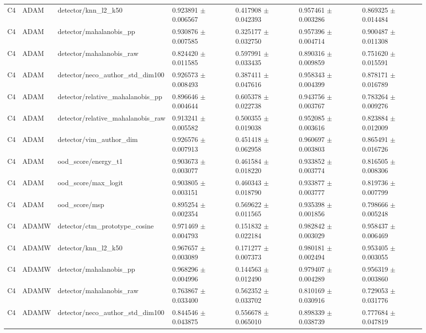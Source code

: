\begin{longtable}{lllllll}
C4 & ADAM & detector/knn\_l2\_k50 & 0.923891 $\pm$ 0.006567 & 0.417908 $\pm$ 0.042393 & 0.957461 $\pm$ 0.003286 & 0.869325 $\pm$ 0.014484 \\
C4 & ADAM & detector/mahalanobis\_pp & 0.930876 $\pm$ 0.007585 & 0.325177 $\pm$ 0.032750 & 0.957396 $\pm$ 0.004714 & 0.900487 $\pm$ 0.011308 \\
C4 & ADAM & detector/mahalanobis\_raw & 0.824420 $\pm$ 0.011585 & 0.597991 $\pm$ 0.033435 & 0.890316 $\pm$ 0.009859 & 0.751620 $\pm$ 0.015591 \\
C4 & ADAM & detector/neco\_author\_std\_dim100 & 0.926573 $\pm$ 0.008493 & 0.387411 $\pm$ 0.047616 & 0.958343 $\pm$ 0.004399 & 0.878171 $\pm$ 0.016789 \\
C4 & ADAM & detector/relative\_mahalanobis\_pp & 0.896646 $\pm$ 0.004644 & 0.605378 $\pm$ 0.022738 & 0.943756 $\pm$ 0.003767 & 0.783264 $\pm$ 0.009276 \\
C4 & ADAM & detector/relative\_mahalanobis\_raw & 0.913241 $\pm$ 0.005582 & 0.500355 $\pm$ 0.019038 & 0.952085 $\pm$ 0.003616 & 0.823884 $\pm$ 0.012009 \\
C4 & ADAM & detector/vim\_author\_dim & 0.926576 $\pm$ 0.007913 & 0.451418 $\pm$ 0.062958 & 0.960697 $\pm$ 0.003803 & 0.865491 $\pm$ 0.016726 \\
C4 & ADAM & ood\_score/energy\_t1 & 0.903673 $\pm$ 0.003077 & 0.461584 $\pm$ 0.018220 & 0.933852 $\pm$ 0.003774 & 0.816505 $\pm$ 0.008306 \\
C4 & ADAM & ood\_score/max\_logit & 0.903805 $\pm$ 0.003151 & 0.460343 $\pm$ 0.018790 & 0.933877 $\pm$ 0.003777 & 0.819736 $\pm$ 0.007799 \\
C4 & ADAM & ood\_score/msp & 0.895254 $\pm$ 0.002354 & 0.569622 $\pm$ 0.011565 & 0.935398 $\pm$ 0.001856 & 0.798666 $\pm$ 0.005248 \\
C4 & ADAMW & detector/ctm\_prototype\_cosine & 0.971469 $\pm$ 0.004793 & 0.151832 $\pm$ 0.022184 & 0.982842 $\pm$ 0.003029 & 0.958437 $\pm$ 0.006469 \\
C4 & ADAMW & detector/knn\_l2\_k50 & 0.967657 $\pm$ 0.003089 & 0.171277 $\pm$ 0.007373 & 0.980181 $\pm$ 0.002494 & 0.953405 $\pm$ 0.003055 \\
C4 & ADAMW & detector/mahalanobis\_pp & 0.968296 $\pm$ 0.004996 & 0.144563 $\pm$ 0.012490 & 0.979407 $\pm$ 0.004289 & 0.956319 $\pm$ 0.003860 \\
C4 & ADAMW & detector/mahalanobis\_raw & 0.763867 $\pm$ 0.033400 & 0.562352 $\pm$ 0.033702 & 0.810169 $\pm$ 0.030916 & 0.729053 $\pm$ 0.031776 \\
C4 & ADAMW & detector/neco\_author\_std\_dim100 & 0.844546 $\pm$ 0.043875 & 0.556678 $\pm$ 0.065010 & 0.898339 $\pm$ 0.038739 & 0.777684 $\pm$ 0.047819 \\

\end{longtable}
